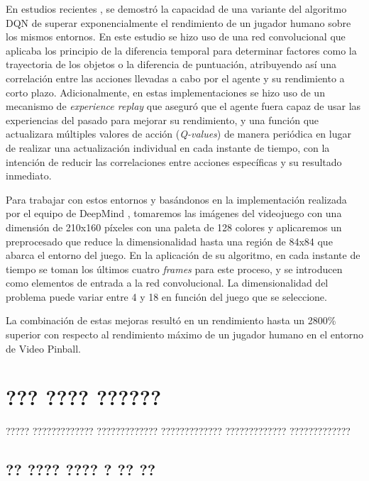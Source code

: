 \documentclass[11pt,spanish,listoffigures,listoftables]{tfgetsinf}
\begin{document}
En estudios recientes \cite{dqn}, se demostró la capacidad de una variante del algoritmo DQN de superar exponencialmente el rendimiento de un jugador humano sobre los mismos entornos. En este estudio se hizo uso de una red convolucional que aplicaba los principio de la diferencia temporal para determinar factores como la trayectoria de los objetos o la diferencia de puntuación, atribuyendo así una correlación entre las acciones llevadas a cabo por el agente y su rendimiento a corto plazo. Adicionalmente, en estas implementaciones se hizo uso de un mecanismo de \textit{experience replay} que aseguró que el agente fuera capaz de usar las experiencias del pasado para mejorar su rendimiento, y una función que actualizara  múltiples valores de acción (\textit{Q-values}) de manera periódica en lugar de realizar una actualización individual en cada instante de tiempo, con la intención de reducir las correlaciones entre acciones específicas y su resultado inmediato. 

Para trabajar con estos entornos y basándonos en la implementación realizada por el equipo de DeepMind \cite{atari_dqn}, tomaremos las imágenes del videojuego con una dimensión de 210x160 píxeles con una paleta de 128 colores y aplicaremos un preprocesado que reduce la dimensionalidad hasta una región de 84x84 que abarca el entorno del juego. En la aplicación de su algoritmo, en cada instante de tiempo se toman los últimos cuatro \textit{frames} para este proceso, y se introducen como elementos de entrada a la red convolucional. La dimensionalidad del problema puede variar entre 4 y 18 en función del juego que se seleccione. 

La combinación de estas mejoras resultó en un rendimiento hasta un 2800\% superior con respecto al rendimiento máximo de un jugador humano en el entorno de Video Pinball. 

 









\chapter{??? ???? ??????}

????? ????????????? ????????????? ????????????? ????????????? ????????????? 

\section{?? ???? ???? ? ?? ??}
\end{document}
